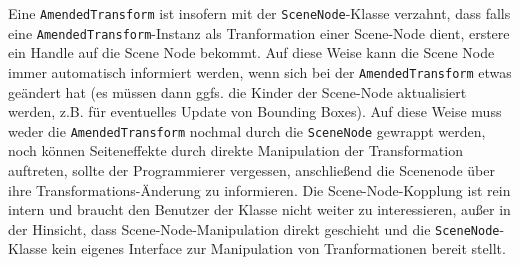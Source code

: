 	
	Eine \lstinline|AmendedTransform| ist insofern mit der \lstinline|SceneNode|-Klasse verzahnt, dass falls eine
	\lstinline|AmendedTransform|-Instanz als Tranformation einer Scene-Node dient, erstere ein Handle auf die Scene Node 
	bekommt. Auf diese Weise kann die Scene Node immer automatisch informiert werden, wenn sich bei der 
	\lstinline|AmendedTransform| etwas geändert hat (es müssen dann ggfs. die Kinder der Scene-Node aktualisiert werden,
	z.B. für eventuelles Update von Bounding Boxes). Auf diese Weise muss weder die \lstinline|AmendedTransform|
	nochmal durch die \lstinline|SceneNode| gewrappt werden, noch können Seiteneffekte durch direkte Manipulation der 
	Transformation auftreten, sollte der Programmierer vergessen, anschließend die Scenenode über ihre 
	Transformations-Änderung zu informieren.
	Die Scene-Node-Kopplung ist rein intern und braucht den Benutzer der Klasse nicht weiter zu interessieren,
	außer in der Hinsicht, dass Scene-Node-Manipulation direkt geschieht und die \lstinline|SceneNode|-Klasse
	kein eigenes Interface zur Manipulation von Tranformationen bereit stellt.
	
